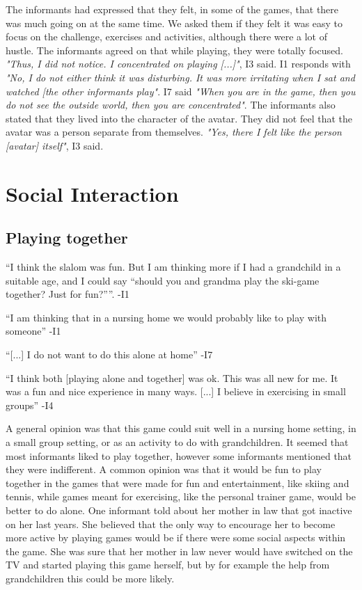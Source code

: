The informants had expressed that they felt, in some of the games, that there was much going on at the same time. We asked them if they felt it was easy to focus on the challenge, exercises and activities, although there were a lot of hustle. The informants agreed on that while playing, they were totally focused. \emph{"Thus, I did not notice. I concentrated on playing [...]"}, I3 said. I1 responds with \emph{"No, I do not either think it was disturbing. It was more irritating when I sat and watched [the other informants play"}. I7 said \emph{"When you are in the game, then you do not see the outside world, then you are concentrated"}. The informants also stated that they lived into the character of the avatar. They did not feel that the avatar was a person separate from themselves. \emph{"Yes, there I felt like the person [avatar] itself"}, I3 said.    

\section{Social Interaction}
\subsection{Playing together}
“I think the slalom was fun. But I am thinking more if I had a grandchild in a suitable age, and I could say “should you and grandma play the ski-game together? Just for fun?””. -I1

“I am thinking that in a nursing home we would probably like to play with someone” -I1

“[...] I do not want to do this alone at home” -I7

“I think both [playing alone and together] was ok. This was all new for me. It was a fun and nice experience in many ways. [...] I believe in  exercising in small groups” -I4

A general opinion was that this game could suit well in a nursing home setting, in a small group setting, or as an activity to do with grandchildren. It seemed that most informants liked to play together, however some informants mentioned that they were indifferent. A common opinion was that it would be fun to play together in the games that were made for fun and entertainment, like skiing and tennis, while games meant for exercising, like the personal trainer game, would be better to do alone. One informant told about her mother in law that got inactive on her last years. She believed that the only way to encourage her to become more active by playing games would be if there were some social aspects within the game. She was sure that her mother in law never would have switched on the TV and started playing this game herself, but by for example the help from grandchildren this could be more likely.

